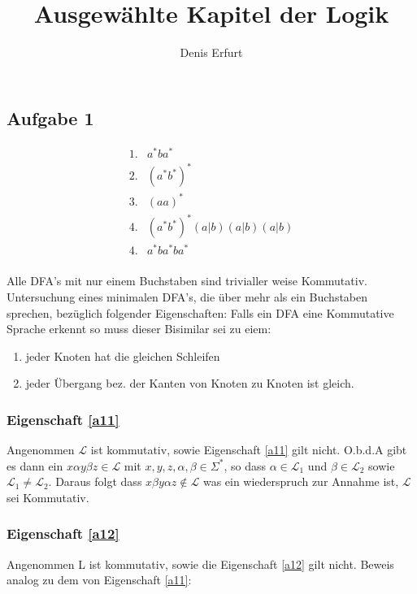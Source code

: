 \documentclass[12pt]{article}
\begin{document}
\title{Ausgewählte Kapitel der Logik}
\author{Denis Erfurt}
\maketitle



\subsection*{Aufgabe 1}
\begin{align}
  1.&a^*ba^* \\
  2.&(a^*b^*)^* \\
  3.&(aa)^* \\
  4.&(a^*b^*)^*(a|b)(a|b)(a|b) \\
  4.&a^*ba^*ba^*\\
\end{align}


Alle DFA's mit nur einem Buchstaben sind trivialler weise Kommutativ.
Untersuchung eines minimalen DFA's, die über mehr als ein Buchstaben sprechen,
bezüglich folgender Eigenschaften:
Falls ein DFA eine Kommutative Sprache erkennt so muss dieser Bisimilar sei zu eiem:
\begin{enumerate}
  \item jeder Knoten hat die gleichen Schleifen \label{a11}
  \item jeder Übergang bez. der Kanten von Knoten zu Knoten ist gleich. \label{a12}
\end{enumerate}

\subsubsection*{Eigenschaft \ref{a11}}
Angenommen $\mathcal{L}$ ist kommutativ, sowie Eigenschaft \ref{a11} gilt nicht.
O.b.d.A gibt es dann ein $x\alpha y\beta z\in \mathcal{L}$ mit $x,y,z,\alpha, \beta\in\Sigma^*$, so dass $\alpha\in \mathcal{L}_1$ und $\beta\in \mathcal{L}_2$ sowie $\mathcal{L}_1\neq \mathcal{L}_2$. Daraus folgt dass $x\beta y\alpha z\notin \mathcal{L}$ was
ein wiederspruch zur Annahme ist, $\mathcal{L}$ sei Kommutativ.

\subsubsection*{Eigenschaft \ref{a12}}
Angenommen L ist kommutativ, sowie die Eigenschaft \ref{a12} gilt nicht.
Beweis analog zu dem von Eigenschaft \ref{a11}:
\end{document}
